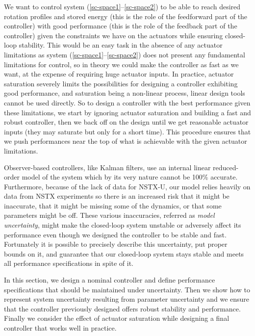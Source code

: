 \documentclass[12pt,lot, lof]{puthesis}
\begin{document}
We want to control system (\ref{sc-space1}--\ref{sc-space2}) to be able to reach desired rotation profiles and stored energy (this is the role of the feedforward part of the controller) with good performance (this is the role of the feedback part of the controller) given the constraints we have on the actuators while ensuring closed-loop stability.
This would be an easy task in the absence of any actuator limitations as system (\ref{sc-space1}--\ref{sc-space2}) does not present any fundamental limitations for control, so in theory we could make the controller as fast as we want, at the expense of requiring huge actuator inputs.
In practice, actuator saturation severely limits the possibilities for designing a controller exhibiting good performance, and saturation being a non-linear process, linear design tools cannot be used directly.
So to design a controller with the best performance given these limitations, we start by ignoring actuator saturation and building a fast and robust controller, then we back off on the design until we get reasonable actuator inputs (they may saturate but only for a short time).
This procedure ensures that we push performances near the top of what is achievable with the given actuator limitations.

Observer-based controllers, like Kalman filters, use an internal linear reduced-order model of the system which by its very nature cannot be 100\% accurate.
Furthermore, because of the lack of data for NSTX-U, our model relies heavily on data from NSTX experiments so there is an increased risk that it might be inaccurate, that it might be missing some of the dynamics, or that some parameters might be off.
These various inaccuracies, referred as \emph{model uncertainty}, might make the closed-loop system unstable or adversely affect its performance even though we designed the controller to be stable and fast.
Fortunately it is possible to precisely describe this uncertainty, put proper bounds on it, and guarantee that our closed-loop system stays stable and meets all performance specifications in spite of it.

In this section, we design a nominal controller and define performance specifications that should be maintained under uncertainty.
Then we show how to represent system uncertainty resulting from parameter uncertainty and we ensure that the controller previously designed offers robust stability and performance.
Finally we consider the effect of actuator saturation while designing a final controller that works well in practice.
\end{document}
